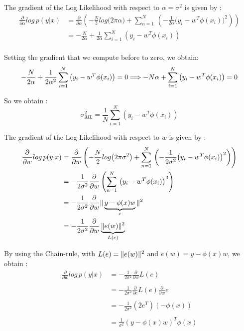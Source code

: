 \documentclass[12pt,twoside]{article}
\begin{document}
The gradient of the Log Likelihood with respect to $\alpha = \sigma^2$ is given by :
\begin{align*}
\frac{\partial}{\partial \alpha}log \,p(y| x) &= \frac{\partial}{\partial \alpha}  \left( -\frac{N}{2} log\big(2 \pi \alpha\big) + \sum_{n=1}^{N}  \, \left( -\frac{1}{2 \alpha}\big(y_i - w^T \phi(x_i)\big)^2 \right) \right) \\
&= -\frac{N}{2 \alpha} + \frac{1}{2 \alpha } \sum_{i=1}^{N} \left( y_i - w^T \phi(x_i)\right)   \\
\end{align*}

Setting the gradient that we compute before to zero, we obtain:
\begin{equation*}
-\frac{N}{2 \alpha} + \frac{1}{2 \alpha^2 } \sum_{i=1}^{N} \left( y_i - w^T \phi(x_i)\right) = 0 \\
\Longrightarrow  -N \alpha + \sum_{i=1}^{N} \left( y_i - w^T \phi(x_i)\right) = 0
\end{equation*}

So we obtain :
\begin{equation}
\boxed{ \sigma^2 _{ML} = \frac{1}{N} \sum_{i=1}^{N} \left( y_i - w^T \phi(x_i)\right) }
\end{equation}

The gradient of the Log Likelihood with respect to $w$ is given by :
\begin{align*}
\frac{\partial}{\partial w}log \,p(y| x) &= \frac{\partial}{\partial w}  \left( -\frac{N}{2} log\big(2 \pi \sigma^2\big) + \sum_{n=1}^{N}  \, \left( -\frac{1}{2 \sigma^2}\big(y_i - w^T \phi(x_i)\big)^2 \right) \right) \\
&= -\frac{1}{2 \sigma^2} \frac{\partial}{\partial w}  \left( \sum_{n=1}^{N}  \, \left( y_i - w^T \phi(x_i)\right)^2  \right)   \\
&= -\frac{1}{2 \sigma^2} \frac{\partial}{\partial w} \Arrowvert \underbrace{ y - \phi(x)w }_{e}\Arrowvert^2\\
&= -\frac{1}{2 \sigma^2} \frac{\partial}{\partial w} \underbrace{\Arrowvert e(w) \Arrowvert ^2}_{L(e)}\\
\end{align*}

By using the Chain-rule, with $L(e) = \Arrowvert e(w) \Arrowvert ^2$ and $e(w) = y - \phi(x)w$, we obtain : 
\begin{align*}
\frac{\partial}{\partial w}log \,p(y| x) &= -\frac{1}{2 \sigma^2} \frac{\partial}{\partial w}L(e)\\ \\
										 &= -\frac{1}{2 \sigma^2}\frac{\partial}{\partial e}L(e)\frac{\partial}{\partial w}e \\ \\
										 & = -\frac{1}{2 \sigma^2}  \left(2e^T\right) \left(-\phi(x)\right) \\ \\
										 &= \frac{1}{\sigma^2}  \left(y - \phi(x)w\right)^T \phi(x) \\ \\
\end{align*}
\end{document}

